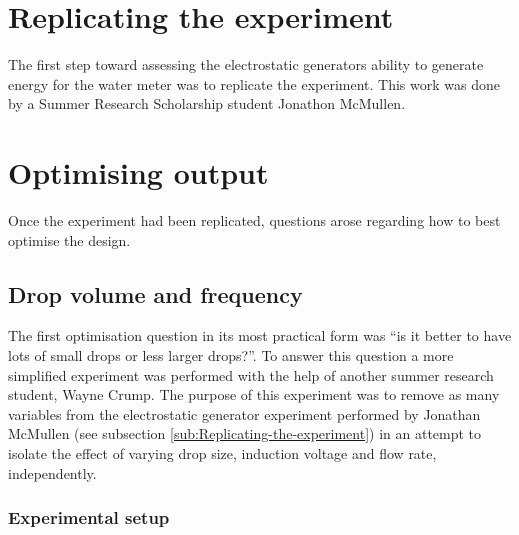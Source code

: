 \section{Replicating the experiment\label{sub:Replicating-the-experiment}}

The first step toward assessing the electrostatic generators ability
to generate energy for the water meter was to replicate the experiment.
This work was done by a Summer Research Scholarship student Jonathon
McMullen.


\section{Optimising output}

Once the experiment had been replicated, questions arose regarding
how to best optimise the design.


\subsection{Drop volume and frequency}

The first optimisation question in its most practical form was ``is
it better to have lots of small drops or less larger drops?''. To
answer this question a more simplified experiment was performed with
the help of another summer research student, Wayne Crump. The purpose
of this experiment was to remove as many variables from the electrostatic
generator experiment performed by Jonathan McMullen (see subsection
\ref{sub:Replicating-the-experiment}) in an attempt to isolate the
effect of varying drop size, induction voltage and flow rate, independently.


\subsubsection*{Experimental setup}

